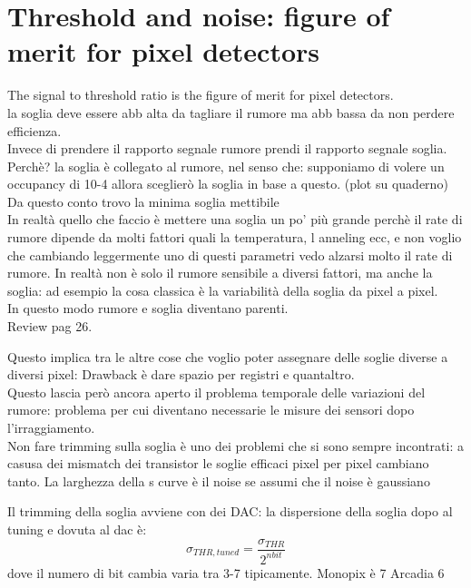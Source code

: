\section{Threshold and noise: figure of merit for pixel detectors}

The signal to threshold ratio is the figure of merit for pixel detectors.\\

la soglia deve essere abb alta da tagliare il rumore ma abb bassa da non perdere efficienza.\\
Invece di prendere il rapporto segnale rumore prendi il rapporto segnale soglia. Perchè?
la soglia è collegato al rumore, nel senso che: supponiamo di volere un occupancy di 10-4
allora sceglierò la soglia in base a questo. (plot su quaderno)
Da questo conto trovo la minima soglia mettibile\\
In realtà quello che faccio è mettere una soglia un po' più grande perchè il rate di rumore
dipende da molti fattori quali la temperatura, l anneling ecc, e non voglio che cambiando leggermente
uno di questi parametri vedo alzarsi molto il rate di rumore. In realtà non è solo il
rumore sensibile a diversi fattori, ma anche la soglia: ad esempio la cosa classica è
la variabilità della soglia da pixel a pixel.\\
In questo modo rumore e soglia diventano parenti.\\
Review pag 26.


Questo implica tra le altre cose che voglio poter assegnare delle soglie diverse
a diversi pixel: Drawback è dare spazio per registri e quantaltro.\\
Questo lascia però ancora aperto il problema temporale delle variazioni del rumore:
problema per cui diventano necessarie le misure dei sensori dopo l'irraggiamento.\\


Non fare trimming sulla soglia è uno dei problemi che si sono sempre incontrati: a casusa dei mismatch dei transistor
le soglie efficaci pixel per pixel cambiano tanto.
La larghezza della s curve è il noise se assumi che il noise è gaussiano


Il trimming della soglia avviene con dei DAC: la dispersione della soglia dopo al tuning e dovuta al dac è: 
\begin{equation}
    \sigma_{THR, tuned} = \frac{\sigma_{THR}}{2^{n bit}}
\end{equation}
dove il numero di bit cambia varia tra 3-7 tipicamente. Monopix è 7 Arcadia 6\\

